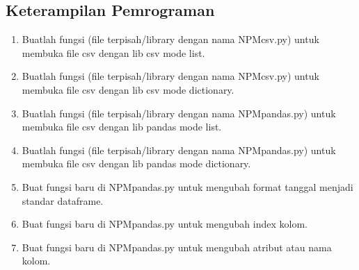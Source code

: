 \subsection{Keterampilan Pemrograman}
\begin{enumerate}
	\item Buatlah  fungsi  (file  terpisah/library  dengan  nama  NPMcsv.py)  untuk  membuka file csv dengan lib csv mode list.
	
	
	
	\item Buatlah  fungsi  (file  terpisah/library  dengan  nama  NPMcsv.py)  untuk  membuka file csv dengan lib csv mode dictionary.
	
	
	
	\item Buatlah fungsi (file terpisah/library dengan nama NPMpandas.py) untuk membuka file csv dengan lib pandas mode list.
	
	
	
	\item Buatlah fungsi (file terpisah/library dengan nama NPMpandas.py) untuk membuka file csv dengan lib pandas mode dictionary.
	
	
	
	\item  Buat fungsi baru di NPMpandas.py untuk mengubah format tanggal menjadi standar dataframe.
	
	
	
	\item Buat fungsi baru di NPMpandas.py untuk mengubah index kolom.
	
	
	
	\item Buat fungsi baru di NPMpandas.py untuk mengubah atribut atau nama kolom.
	

\end{enumerate}
